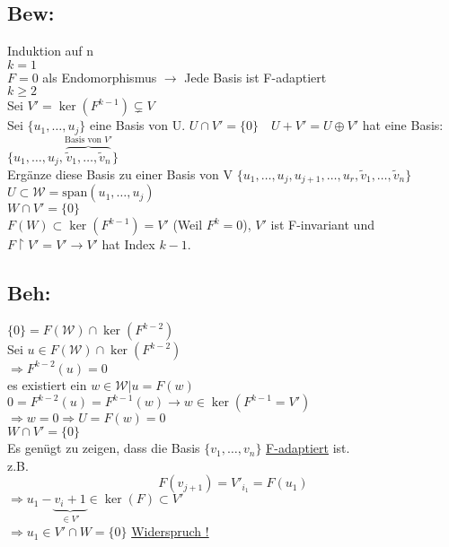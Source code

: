 \documentclass[titlepage,12pt,a4paper,ngerman]{report}
\newcommand{\tx}[1]{\textrm{#1}}
\newcommand{\ub}[1]{\underbrace{#1}}
\newcommand{\ob}[1]{\overbrace{#1}}
\newcommand{\spa}{\tx{span}}
\begin{document}
\subsection{Bew:}
Induktion auf n\\
$ \boxed{k=1} $\\
$ F = 0 $ als Endomorphismus $ \rightarrow $ Jede Basis ist F-adaptiert\\
$ \boxed{k\ge 2} $\\
Sei $ V' = \ker(F^{k-1}) \subsetneq V $\\
Sei $ \{u_1,\dots , u_j\} $ eine Basis von U.
$U \cap V' = \{0\} \quad U + V' = U \oplus V'$
hat eine Basis: $ \{u_1,\dots,u_j,\ob{\tilde{v}_1, \dots, \tilde{v}_n }^{\tx{Basis von } V'}\} $\\
Ergänze diese Basis zu einer Basis von V $ \{u_1,\dots,u_j,u_{j+1},\dots,u_r,\tilde{v}_1 , \dots , \tilde{v}_n\} $\\
$U \subset \mathcal{W} = \spa(u_1,\dots,u_j)$\\
$ W \cap V' = \{0\} $\\
$ F(W) \subset \ker(F^{k-1}) = V' $ (Weil $ F^k = 0 $), $V'$ ist F-invariant und\\
$ F \upharpoonright V' = V' \to V' $ hat Index \underline{\underline{$ k-1 $}}.
\subsection{Beh:}
$ \{0\} = F(\mathcal{W}) \cap \ker(F^{k-2}) $\\
Sei $ u \in F(\mathcal{W}) \cap \ker(F^{k-2}) $\\
$ \Rightarrow F^{k-2}(u) = 0 $\\
es existiert ein $ w \in \mathcal{W} | u = F(w) $\\
$ 0 = F^{k-2}(u) = F^{k-1} (w)  \rightarrow w \in \ker(F^{k-1} = V')$\\
$ \Rightarrow w = 0 \Rightarrow U = F(w) = 0 $\\
$ W \cap V' = \{0\} $\\


Es genügt zu zeigen, dass die Basis $ \{v_1,\dots,v_n\} $ \underline{F-adaptiert} ist.\\
z.B. $$F(v_{j+1})  = V'_{i_1} = F(u_1)$$
$ \Rightarrow u_1 - \ub{v_i +1}_{\in V'} \in \ker(F) \subset V' $\\
$ \Rightarrow u_1 \in V' \cap W = \{0\} $ \underline{Widerspruch !}\\\\
\end{document}
